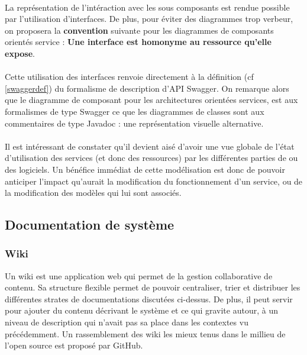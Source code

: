         \paragraph{}
            La représentation de l'intéraction avec les sous composants est rendue possible par l'utilisation
            d'interfaces. De plus, pour éviter des diagrammes trop verbeur, on proposera la \textbf{convention}
            suivante pour les diagrammes de composants orientés service : \textbf{Une interface
            est homonyme au ressource qu'elle expose}.

        \paragraph{}
            Cette utilisation des interfaces renvoie directement à la définition (cf \ref{swaggerdef})
            du formalisme de description d'API Swagger. On remarque alors que le diagramme de composant pour
            les architectures orientées services, est aux formalismes de type Swagger ce que les diagrammes
            de classes sont aux commentaires de type Javadoc : une représentation visuelle alternative.


        \paragraph{}
            Il est intéressant de constater qu'il devient aisé d'avoir une vue globale de l'état
            d'utilisation des services (et donc des ressources) par les différentes parties de ou des
            logiciels. Un bénéfice immédiat de cette modélisation est donc de pouvoir anticiper l'impact
            qu'aurait la modification du fonctionnement d'un service, ou de la modification des modèles
            qui lui sont associés.

\newpage
\subsection{Documentation de système}
    \subsubsection{Wiki}
        Un wiki est une application web qui permet de la gestion collaborative de contenu.
        Sa structure flexible permet de pouvoir centraliser, trier et distribuer les différentes strates
        de documentations discutées ci-dessus. De plus, il peut servir pour ajouter du contenu décrivant
        le système et ce qui gravite autour, à un niveau de description qui n'avait pas sa place dans les
        contextes vu précédemment. Un rassemblement des wiki les mieux tenus dans le millieu de l'open source
        est proposé par GitHub\cite{wiki}.


